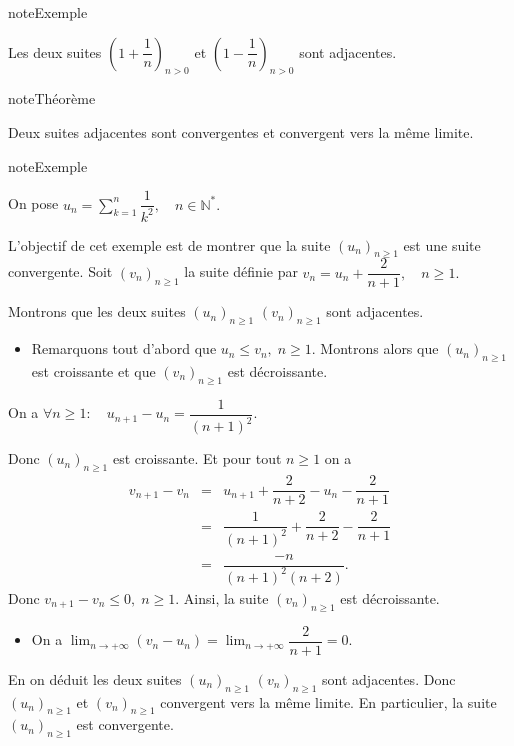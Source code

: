 \documentclass[letterpaper,10pt,french]{jupyterBook}
\begin{document}
\begin{sphinxadmonition}{note}{Exemple}

\sphinxAtStartPar
Les deux suites \((1+\dfrac{1}{n})_{n>0}\) et \((1-\dfrac{1}{n})_{n>0}\) sont adjacentes.
\end{sphinxadmonition}

\begin{sphinxadmonition}{note}{Théorème}

\sphinxAtStartPar
Deux suites adjacentes sont convergentes et convergent vers la même limite.
\end{sphinxadmonition}

\begin{sphinxadmonition}{note}{Exemple}

\sphinxAtStartPar
On pose \(u_n=\sum_{k=1}^{n}\dfrac{1}{k^2},\quad n\in \mathbb{N}^{*}.\)

\sphinxAtStartPar
L’objectif de cet exemple est de montrer que la suite \((u_n)_{n\geq1}\) est une suite convergente. Soit \((v_n)_{n\geq1}\) la suite définie par \(v_n=u_n+\dfrac{2}{n+1},\quad n\geq1.\)

\sphinxAtStartPar
Montrons que les deux suites \((u_n)_{n\geq1}\) \((v_n)_{n\geq1}\) sont adjacentes.
\begin{itemize}
\item {} 
\sphinxAtStartPar
Remarquons tout d’abord que \(u_n\leq v_n,\;n\geq1.\) Montrons alors que \((u_n)_{n\geq1}\) est croissante et que \((v_n)_{n\geq1}\) est décroissante.

\end{itemize}

\sphinxAtStartPar
On a \(\forall n\geq 1:\quad u_{n+1}-u_n=\dfrac{1}{(n+1)^2}.\)

\sphinxAtStartPar
Donc \((u_n)_{n\geq1}\) est croissante. Et pour tout \(n\geq1\) on a
\begin{eqnarray*}
v_{n+1}-v_n
&=& u_{n+1}+\dfrac{2}{n+2}-u_n-\dfrac{2}{n+1}\\
&=& \dfrac{1}{(n+1)^2}+\dfrac{2}{n+2}-\dfrac{2}{n+1}\\
&=& \dfrac{-n}{(n+1)^2 (n+2)}.
\end{eqnarray*}
\sphinxAtStartPar
Donc \(v_{n+1}-v_n\leq0,\;n\geq1.\) Ainsi, la suite \((v_n)_{n\geq1}\) est décroissante.
\begin{itemize}
\item {} 
\sphinxAtStartPar
On a \(\lim_{n \rightarrow +\infty}(v_n-u_n)=\lim_{n \rightarrow +\infty}\dfrac{2}{n+1}=0.\)

\end{itemize}

\sphinxAtStartPar
En on déduit les deux suites \((u_n)_{n\geq1}\) \((v_n)_{n\geq1}\) sont adjacentes. Donc \((u_n)_{n\geq1}\) et \((v_n)_{n\geq1}\) convergent vers la même limite. En particulier, la suite \((u_n)_{n\geq1}\) est convergente.
\end{sphinxadmonition}
\end{document}

